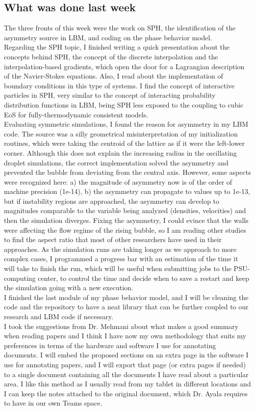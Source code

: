 \documentclass[12pt]{article}
\begin{document}
	\subsection*{What was done last week}
	The three fronts of this week were the work on SPH, the identification of the asymmetry source in LBM, and coding on the phase behavior model.\\
	Regarding the SPH topic, I finished writing a quick presentation about the concepts behind SPH, the concept of the discrete interpolation and the interpolation-based gradients, which open the door for a Lagrangian description of the Navier-Stokes equations. Also, I read about the implementation of boundary conditions in this type of systems. I find the concept of interactive particles in SPH, very similar to the concept of interacting probability distribution functions in LBM, being SPH less exposed to the coupling to cubic EoS for fully-thermodynamic consistent models.\\
	Evaluating symmetric simulations, I found the reason for asymmetry in my LBM code. The source was a silly geometrical misinterpretation of my initialization routines, which were taking the centroid of the lattice as if it were the left-lower corner. Although this does not explain the increasing radius in the oscillating droplet simulations, the correct implementation solved the asymmetry and prevented the bubble from deviating from the central axis. However, some aspects were recognized here: a) the magnitude of asymmetry now is of the order of machine precision (1e-14), b) the asymmetry can propagate to values up to 1e-13, but if instability regions are approached, the asymmetry can develop to magnitudes comparable to the variable being analyzed (densities, velocities) and then the simulation diverges. Fixing the asymmetry, I could evince that the walls were affecting the flow regime of the rising bubble, so I am reading other studies to find the aspect ratio that most of other researchers have used in their approaches. As the simulation runs are taking longer as we approach to more complex cases, I programmed a progress bar with an estimation of the time it will take to finish the run, which will be useful when submitting jobs to the PSU-computing center, to control the time and decide when to save a restart and keep the simulation going with a new execution.\\
	I finished the last module of my phase behavior model, and I will be cleaning the code and the repository to have a neat library that can be further coupled to our research and LBM code if necessary.\\
	I took the suggestions from Dr. Mehmani about what makes a good summary when reading papers and I think I have now my own methodology that suits my preferences in terms of the hardware and software I use for annotating documents. I will embed the proposed sections on an extra page in the software I use for annotating papers, and I will export that page (or extra pages if needed) to a single document containing all the documents I have read about a particular area. I like this method as I usually read from my tablet in different locations and I can keep the notes attached to the original document, which Dr. Ayala requires to have in our own Teams space.
	
\end{document}
